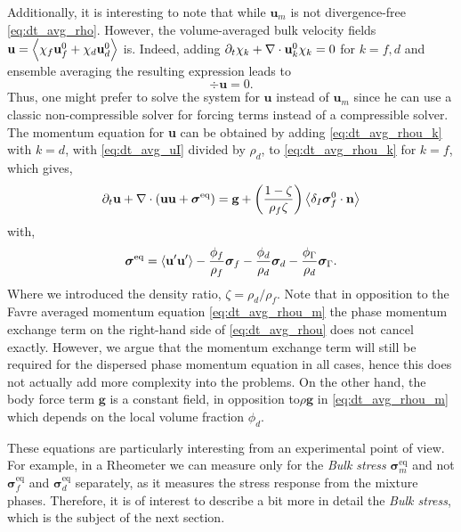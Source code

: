 Additionally, it is interesting to note that while $\textbf{u}_m$ is not divergence-free \eqref{eq:dt_avg_rho}. 
However,  the volume-averaged bulk velocity fields $\textbf{u} = \left<\chi_f \textbf{u}_f^0 + \chi_d \textbf{u}_d^0\right> $ is. 
Indeed, adding $\partial_t \chi_k + \mathbf{\nabla}\cdot \textbf{u}_k^0\chi_k =0$ for $k=f,d$ and ensemble averaging the resulting expression leads to 
\begin{equation}
    \div\textbf{u}=0.
\end{equation}
Thus, one might prefer to solve the system for $\textbf{u}$ instead of $\textbf{u}_m$ since he can use a classic non-compressible solver for forcing terms instead of a compressible solver. 
The momentum equation for \textbf{u} can be obtained by adding \ref{eq:dt_avg_rhou_k} with $k=d$, with \ref{eq:dt_avg_uI} divided by $\rho_d$, to \ref{eq:dt_avg_rhou_k} for $k=f$, which gives, 
\begin{equation}
    \pddt \textbf{u}  
    + \div (
        \textbf{u}\textbf{u}
        + \bm{\sigma}^\text{eq}
    )
    = 
    \textbf{g} 
    + \left(\frac{1-\zeta}{\rho_f\zeta}\right) \avg{\delta_I \bm{\sigma}_f^0 \cdot \textbf{n}} 
    \label{eq:dt_avg_rhou}
\end{equation}
with, 
\begin{equation}
    \bm\sigma^\text{eq} = 
    \left< \textbf{u}'\textbf{u}'\right>
    - \frac{\phi_f}{\rho_f}\bm\sigma_f
    - \frac{\phi_d}{\rho_d}\bm\sigma_d
    - \frac{\phi_\Gamma}{\rho_d} \bm\sigma_\Gamma. 
\end{equation}
Where we introduced the density ratio, $\zeta = \rho_d  / \rho_f$. 
Note that in opposition to the Favre averaged momentum equation \eqref{eq:dt_avg_rhou_m} the phase momentum exchange term on the right-hand side of \ref{eq:dt_avg_rhou} does not cancel exactly. 
However, we argue that the momentum exchange term will still be required for the dispersed phase momentum equation in all cases, hence this does not actually add more complexity into the problems.
On the other hand, the body force term $\textbf{g}$ is a constant field, in opposition to$\rho \textbf{g}$ in \eqref{eq:dt_avg_rhou_m} which depends on the local volume fraction $\phi_d$. 


These equations are particularly interesting from an experimental point of view. 
For example, in a Rheometer we can measure only for the \textit{Bulk stress} $\bm\sigma^\text{eq}_m$ and not $\bm\sigma^\text{eq}_f$ and $\bm\sigma^\text{eq}_d$ separately, as it measures the stress response from the mixture phases. 
Therefore, it is of interest to describe a bit more in detail the \textit{Bulk stress}, which is the subject of the next section.